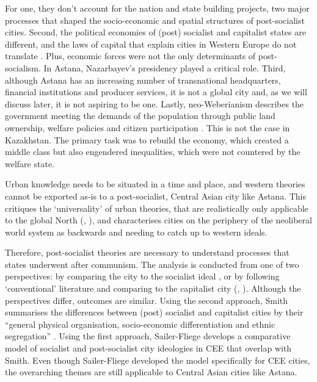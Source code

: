 \documentclass{article}
\begin{document}
For one, they don't account for the nation and state building projects, two major processes that shaped the socio-economic and spatial structures of post-socialist cities.
Second, the political economies of (post) socialist and capitalist states are different, and the laws of capital that explain cities in Western Europe do not translate \parencite{hirt2013whatever}. Plus, economic forces were not the only determinants of post-socialism. In Astana, Nazarbayev's presidency played a critical role.
Third, although Astana has an increasing number of transnational headquarters, financial institutions and producer services, it is not a global city and, as we will discuss later, it is not aspiring to be one.
Lastly, neo-Weberianism describes the government meeting the demands of the population through public land ownership, welfare policies and citizen participation \parencite{haussermann2005european}. This is not the case in Kazakhstan. The primary task was to rebuild the economy, which created a middle class but also engendered inequalities, which were not countered by the welfare state.

Urban knowledge needs to be situated in a time and place, and western theories cannot be exported as-is to a post-socialist, Central Asian city like Astana. This critiques the `universality' of urban theories, that are realistically only applicable to the global North (\cite{ferenvcuhova2016accounts}, \cite{robinson2013ordinary}), and characterises cities on the periphery of the neoliberal world system as backwards and needing to catch up to western ideals.

Therefore, post-socialist theories are necessary to understand processes that states underwent after communism. The analysis is conducted from one of two perspectives: by comparing the city to the socialist ideal \parencite{sailer1999characteristics}, or by following `conventional' literature and comparing to the capitalist city (\cite{smith1996socialist}, \cite{haussermann1996socialist}). Although the perspectives differ, outcomes are similar. Using the second approach, Smith summarises the differences between (post) socialist and capitalist cities by their ``general physical organisation, socio-economic differentiation and ethnic segregation'' \parencite{smith1996socialist}. Using the first approach, Sailer-Fliege develops a comparative model of socialist and post-socialist city ideologies in CEE that overlap with Smith. Even though Sailer-Fliege developed the model specifically for CEE cities, the overarching themes are still applicable to Central Asian cities like Astana.
\end{document}
